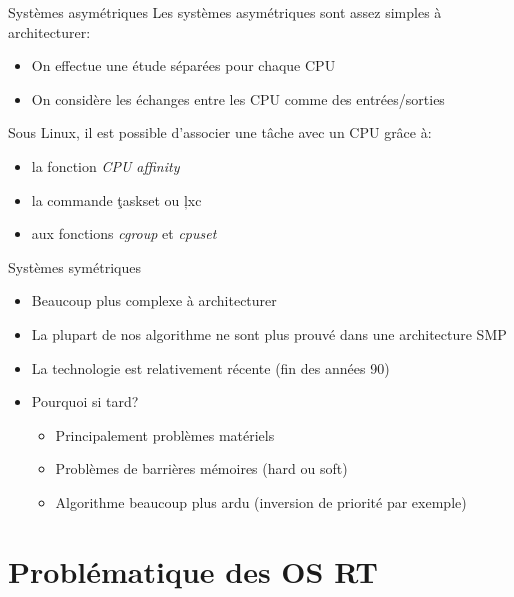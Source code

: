 \begin{frame}{Systèmes asymétriques}
  Les systèmes asymétriques sont assez simples à architecturer:
  \begin{itemize}
  \item On effectue une étude séparées pour chaque CPU
  \item   On  considère  les   échanges  entre   les  CPU   comme  des
    entrées/sorties
  \end{itemize}
  Sous Linux, il  est possible d'associer une tâche  avec un CPU grâce
  à:
  \begin{itemize}
  \item la fonction \emph{CPU affinity}
  \item la commande \c{taskset} ou \c{lxc}
  \item aux fonctions \emph{cgroup} et \emph{cpuset}
  \end{itemize}
\end{frame}

\begin{frame}{Systèmes symétriques}
  \begin{itemize}
  \item Beaucoup plus complexe à architecturer
  \item  La plupart de  nos algorithme  ne sont  plus prouvé  dans une
    architecture SMP
  \item La technologie est relativement récente (fin des années 90)
  \item Pourquoi si tard?
    \begin{itemize}
    \item Principalement problèmes matériels
    \item Problèmes de barrières mémoires (hard ou soft)
    \item Algorithme  beaucoup plus  ardu (inversion de  priorité par
      exemple)
    \end{itemize}
  \end{itemize}
\end{frame}

\section{Problématique des OS RT} %

